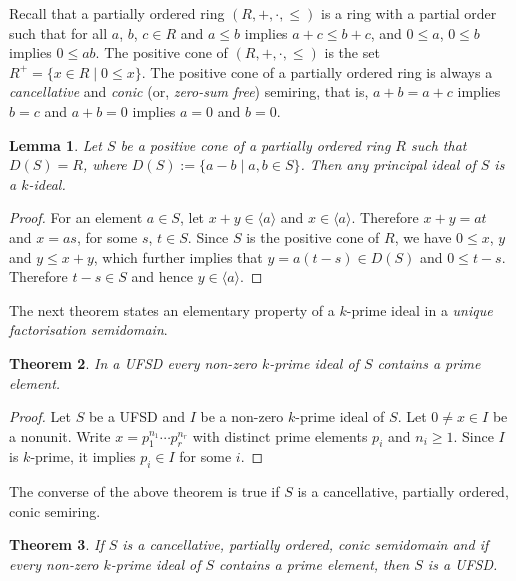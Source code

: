 \documentclass[11pt,leqno]{amsart}
\newtheorem{theorem}{Theorem}[section]
\newtheorem{lemma}[theorem]{Lemma}
\theoremstyle{definition}
\numberwithin{equation}{section}
\begin{document}
Recall that a partially ordered ring $(R,+,\cdot,\leqslant)$ is a ring with a partial order such that for all $a$, $b$, $c\in R$ and $a\leqslant b$ implies $a+c\leqslant b+c$, and $0\leqslant a$, $0\leqslant b$ implies $0\leqslant ab$. The positive cone of $(R,+,\cdot,\leqslant)$ is the set $R^+=\{x\in R\mid 0\leqslant x\}$. The positive cone of a partially ordered ring is always a \emph{cancellative} and \emph{conic} (or, \emph{zero-sum free}) semiring, that is, $a+b=a+c$ implies $b=c$ and $a+b=0$ implies $a=0$ and $b=0$.

\begin{lemma}\label{loc9}
    Let $S$ be a positive cone of a partially ordered ring $R$ such that $D(S)=R$, where $D(S):=\{a-b \mid a,b\in S\}$. Then any principal ideal of $S$ is a $k$-ideal.
\end{lemma}

\begin{proof}
    For an element $a\in S$, let $x+y\in \langle a\rangle$ and $x\in \langle a\rangle$. Therefore $x+y=at$ and $x=as$, for some $s$, $t\in S$. 
    Since $S$ is the positive cone of $R$, we have $0\leqslant x$, $y$ and $y\leqslant x+y$, which further implies that $y=a(t-s)\in D(S)$ and $0\leqslant t-s$. Therefore $t-s\in S$ and hence $y\in \langle a\rangle$. 
\end{proof}

The next theorem states an elementary property of a $k$-prime ideal in a \emph{unique factorisation semidomain}.

\begin{theorem}
In a \emph{UFSD} every non-zero $k$-prime
ideal of $S$ contains a prime element.
\end{theorem}

\begin{proof}
Let $S$ be a UFSD and $I$ be a non-zero $k$-prime ideal of $S$. Let $0\ne x\in I$ be a nonunit. Write $x=p_1^{n_1}\cdots p_r^{n_r}$ with distinct prime elements $p_i$ and $n_i\ge1$. Since $I$ is $k$-prime, it implies $p_i\in I$ for some $i$.
\end{proof}

The converse of the above theorem is true if $S$ is a cancellative, partially ordered, conic semiring.

\begin{theorem}
    If $S$ is a cancellative, partially ordered, conic semidomain and if every non-zero $k$-prime ideal of $S$ contains a prime element, then $S$ is a \emph{UFSD}.
\end{theorem}
\end{document}
